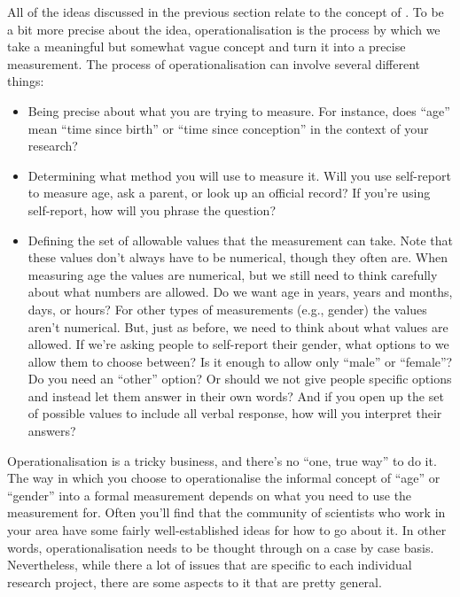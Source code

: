 
All of the ideas discussed in the previous section relate to the concept of . To be a bit more precise about the idea, operationalisation is the process by which we take a meaningful but somewhat vague concept and turn it into a precise measurement. The process of operationalisation can involve several different things:

\begin{itemize}
\item Being precise about what you are trying to measure. For instance, does ``age'' mean ``time since birth'' or ``time since conception'' in the context of your research?
\item Determining what method you will use to measure it. Will you use self-report to measure age, ask a parent, or look up an official record? If you're using self-report, how will you phrase the question? 
\item Defining the set of allowable values that the measurement can take. Note that these values don't always have to be numerical, though they often are. When measuring age the values are numerical, but we still need to think carefully about what numbers are allowed. Do we want age in years, years and months, days, or hours? For other types of measurements (e.g., gender) the values aren't numerical. But, just as before, we need to think about what values are allowed. If we're asking people to self-report their gender, what options to we allow them to choose between? Is it enough to allow only ``male'' or ``female''? Do you need an ``other'' option? Or should we not give people specific options and instead let them answer in their own words? And if you open up the set of possible values to include all verbal response, how will you interpret their answers?
\end{itemize}
 
Operationalisation is a tricky business, and there's no ``one, true way'' to do it. The way in which you choose to operationalise the informal concept of ``age'' or ``gender'' into a formal measurement depends on what you need to use the measurement for. Often you'll find that the community of scientists who work in your area have some fairly well-established ideas for how to go about it. In other words, operationalisation needs to be thought through on a case by case basis. Nevertheless, while there a lot of issues that are specific to each individual research project, there are some aspects to it that are pretty general. 


